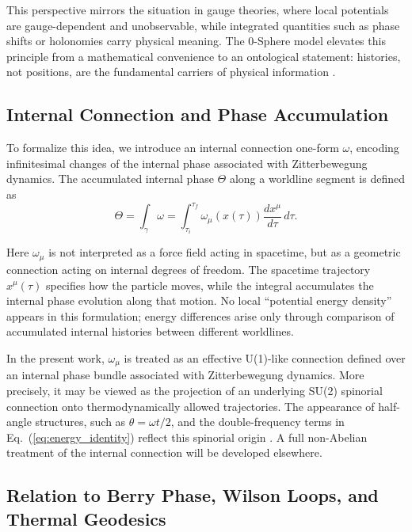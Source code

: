 \documentclass[%
 reprint,
 amsmath,amssymb,
 aps,
 prb,
]{revtex4-2}
\numberwithin{equation}{section}
\begin{document}
This perspective mirrors the situation in gauge theories, where local potentials are gauge-dependent and unobservable, while integrated quantities such as phase shifts or holonomies carry physical meaning. The 0-Sphere model elevates this principle from a mathematical convenience to an ontological statement: histories, not positions, are the fundamental carriers of physical information \cite{Hanamura2026LineIntegrals}.

\subsection{Internal Connection and Phase Accumulation}

To formalize this idea, we introduce an internal connection one-form $\omega$, encoding infinitesimal changes of the internal phase associated with Zitterbewegung dynamics. The accumulated internal phase $\Theta$ along a worldline segment is defined as
\begin{equation}
\Theta = \int_{\gamma} \omega
       = \int_{\tau_i}^{\tau_f} \omega_\mu(x(\tau)) 
         \frac{dx^\mu}{d\tau} \, d\tau .
\label{eq:phase_integral}
\end{equation}

Here $\omega_\mu$ is not interpreted as a force field acting in spacetime, but as a geometric connection acting on internal degrees of freedom. The spacetime trajectory $x^\mu(\tau)$ specifies how the particle moves, while the integral accumulates the internal phase evolution along that motion. No local ``potential energy density'' appears in this formulation; energy differences arise only through comparison of accumulated internal histories between different worldlines.

In the present work, $\omega_\mu$ is treated as an effective U(1)-like connection defined over an internal phase bundle associated with Zitterbewegung dynamics. More precisely, it may be viewed as the projection of an underlying SU(2) spinorial connection onto thermodynamically allowed trajectories. The appearance of half-angle structures, such as $\theta = \omega t/2$, and the double-frequency terms in Eq.~(\ref{eq:energy_identity}) reflect this spinorial origin \cite{Hanamura2025ThermalGeod}. A full non-Abelian treatment of the internal connection will be developed elsewhere.

\subsection{Relation to Berry Phase, Wilson Loops, and Thermal Geodesics}
\end{document}
